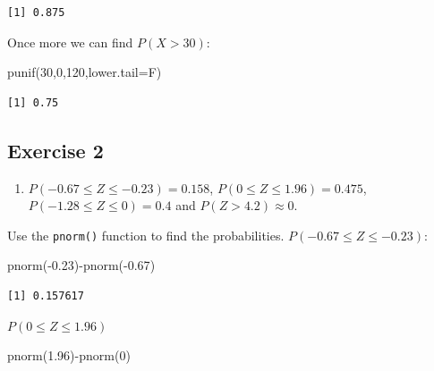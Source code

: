 \documentclass[
  letterpaper,
  DIV=11,
  numbers=noendperiod]{scrreprt}
\newenvironment{Shaded}{\begin{snugshade}}{\end{snugshade}}
\newcommand{\AttributeTok}[1]{\textcolor[rgb]{0.40,0.45,0.13}{#1}}
\newcommand{\DecValTok}[1]{\textcolor[rgb]{0.68,0.00,0.00}{#1}}
\newcommand{\FloatTok}[1]{\textcolor[rgb]{0.68,0.00,0.00}{#1}}
\newcommand{\FunctionTok}[1]{\textcolor[rgb]{0.28,0.35,0.67}{#1}}
\newcommand{\NormalTok}[1]{\textcolor[rgb]{0.00,0.23,0.31}{#1}}
\newcommand{\SpecialCharTok}[1]{\textcolor[rgb]{0.37,0.37,0.37}{#1}}
\providecommand{\tightlist}{%
  \setlength{\itemsep}{0pt}\setlength{\parskip}{0pt}}\usepackage{longtable,booktabs,array}
\begin{document}
\begin{verbatim}
[1] 0.875
\end{verbatim}

Once more we can find \(P(X>30)\):

\begin{Shaded}
\begin{Highlighting}[numbers=left,,]
\FunctionTok{punif}\NormalTok{(}\DecValTok{30}\NormalTok{,}\DecValTok{0}\NormalTok{,}\DecValTok{120}\NormalTok{,}\AttributeTok{lower.tail=}\NormalTok{F)}
\end{Highlighting}
\end{Shaded}

\begin{verbatim}
[1] 0.75
\end{verbatim}

\hypertarget{exercise-2-19}{%
\subsection*{Exercise 2}\label{exercise-2-19}}

\begin{enumerate}
\def\labelenumi{\arabic{enumi}.}
\tightlist
\item
  \(P(-0.67 \leq Z \leq -0.23)=0.158\), \(P(0 \leq Z \leq 1.96)=0.475\),
  \(P(-1.28 \leq Z \leq 0)=0.4\) and \(P(Z > 4.2) \approx 0\).
\end{enumerate}

Use the \texttt{pnorm()} function to find the probabilities.
\(P(-0.67 \leq Z \leq -0.23)\):

\begin{Shaded}
\begin{Highlighting}[numbers=left,,]
\FunctionTok{pnorm}\NormalTok{(}\SpecialCharTok{{-}}\FloatTok{0.23}\NormalTok{)}\SpecialCharTok{{-}}\FunctionTok{pnorm}\NormalTok{(}\SpecialCharTok{{-}}\FloatTok{0.67}\NormalTok{)}
\end{Highlighting}
\end{Shaded}

\begin{verbatim}
[1] 0.157617
\end{verbatim}

\(P(0 \leq Z \leq 1.96)\)

\begin{Shaded}
\begin{Highlighting}[numbers=left,,]
\FunctionTok{pnorm}\NormalTok{(}\FloatTok{1.96}\NormalTok{)}\SpecialCharTok{{-}}\FunctionTok{pnorm}\NormalTok{(}\DecValTok{0}\NormalTok{)}
\end{Highlighting}
\end{Shaded}
\end{document}
